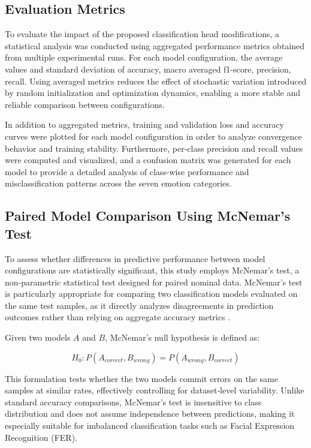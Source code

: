 \subsection{Evaluation Metrics}

To evaluate the impact of the proposed classification head modifications, a statistical analysis was conducted using aggregated performance metrics obtained from multiple experimental runs. For each model configuration, the average values and standard deviation of accuracy, macro averaged f1-score, precision, recall. Using averaged metrics reduces the effect of stochastic variation introduced by random initialization and optimization dynamics, enabling a more stable and reliable comparison between configurations. 

In addition to aggregated metrics, training and validation loss and accuracy curves were plotted for each model configuration in order to analyze convergence behavior and training stability. Furthermore, per-class precision and recall values were computed and visualized, and a confusion matrix was generated for each model to provide a detailed analysis of class-wise performance and misclassification patterns across the seven emotion categories.

\subsection{Paired Model Comparison Using McNemar’s Test}\label{sub:mcnemar_test}

To assess whether differences in predictive performance between model configurations are statistically significant, this study employs McNemar’s test, a non‑parametric statistical test designed for paired nominal data. McNemar’s test is particularly appropriate for comparing two classification models evaluated on the same test samples, as it directly analyzes disagreements in prediction outcomes rather than relying on aggregate accuracy metrics \cite{zhang_leave_2023}.

Given two models $A$ and $B$, McNemar’s null hypothesis is defined as:



$$
H_0:P(A_{correct},B_{wrong})=P(A_{wrong},B_{correct})$$

This formulation tests whether the two models commit errors on the same samples at similar rates, effectively controlling for dataset‑level variability. Unlike standard accuracy comparisons, McNemar’s test is insensitive to class distribution and does not assume independence between predictions, making it especially suitable for imbalanced classification tasks such as Facial Expression Recognition (\gls{FER}).

